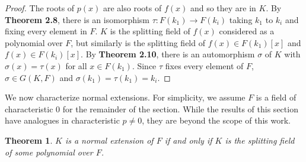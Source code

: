 \documentclass[12pt,leqno]{article}
\numberwithin{equation}{section}
\theoremstyle{plain}
\newtheorem{thm}{Theorem}[section]
\theoremstyle{definition}
\theoremstyle{remark}
\begin{document}
\begin{proof}
 The roots of $p(x)$ are also roots of $f(x)$ and so they are in $K$. By \textbf{Theorem 2.8}, there is an isomorphism $\tau:F(k_1)\to F(k_i)$ taking $k_1$ to $k_i$ and fixing every element in $F$. $K$ is the splitting field of $f(x)$ considered as a polynomial over $F$, but similarly is the splitting field of $f(x)\in F(k_1)[x]$ and $f(x)\in F(k_i)[x]$. By \textbf{Theorem 2.10}, there is an automorphism $\sigma$ of $K$ with $\sigma(x)=\tau(x)$ for all $x\in F(k_1)$. Since $\tau$ fixes every element of $F$, $\sigma\in G(K,F)$ and $\sigma(k_1)=\tau(k_1)=k_i$.
\end{proof}

We now characterize normal extensions. For simplicity, we assume $F$ is a field of characteristic 0 for the remainder of the section. While the results of this section have analogues in characteristic $p\not=0$, they are beyond the scope of this work.

\begin{thm}
 $K$ is a normal extension of $F$ if and only if $K$ is the splitting field of some polynomial over $F$.
\end{thm}
\end{document}
